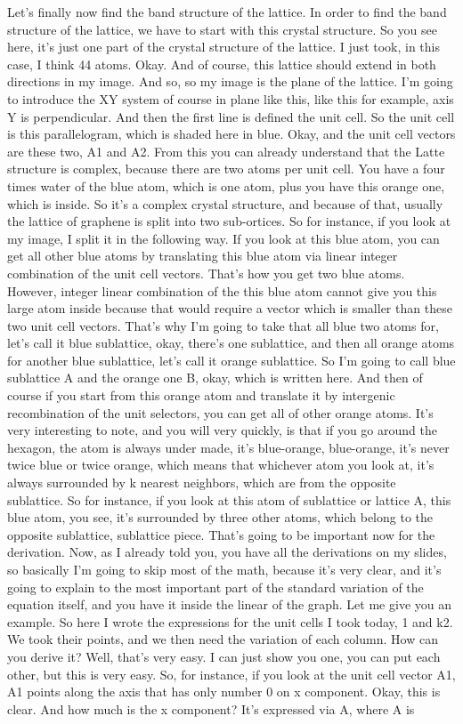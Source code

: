 Let's finally now find the band structure of the lattice. In order to find the band structure of the lattice, we have to start with this crystal structure. So you see here, it's just one part of the crystal structure of the lattice. I just took, in this case, I think 44 atoms. Okay. And of course, this lattice should extend in both directions in my image. And so, so my image is the plane of the lattice. I'm going to introduce the XY system of course in plane like this, like this for example, axis Y is perpendicular. And then the first line is defined the unit cell. So the unit cell is this parallelogram, which is shaded here in blue. Okay, and the unit cell vectors are these two, A1 and A2. From this you can already understand that the Latte structure is complex, because there are two atoms per unit cell. You have a four times water of the blue atom, which is one atom, plus you have this orange one, which is inside. So it's a complex crystal structure, and because of that, usually the lattice of graphene is split into two sub-ortices. So for instance, if you look at my image, I split it in the following way. If you look at this blue atom, you can get all other blue atoms by translating this blue atom via linear integer combination of the unit cell vectors. That's how you get two blue atoms. However, integer linear combination of the this blue atom cannot give you this large atom inside because that would require a vector which is smaller than these two unit cell vectors. That's why I'm going to take that all blue two atoms for, let's call it blue sublattice, okay, there's one sublattice, and then all orange atoms for another blue sublattice, let's call it orange sublattice. So I'm going to call blue sublattice A and the orange one B, okay, which is written here. And then of course if you start from this orange atom and translate it by intergenic recombination of the unit selectors, you can get all of other orange atoms. It's very interesting to note, and you will very quickly, is that if you go around the hexagon, the atom is always under made, it's blue-orange, blue-orange, it's never twice blue or twice orange, which means that whichever atom you look at, it's always surrounded by k nearest neighbors, which are from the opposite sublattice. So for instance, if you look at this atom of sublattice or lattice A, this blue atom, you see, it's surrounded by three other atoms, which belong to the opposite sublattice, sublattice piece. That's going to be important now for the derivation. Now, as I already told you, you have all the derivations on my slides, so basically I'm going to skip most of the math, because it's very clear, and it's going to explain to the most important part of the standard variation of the equation itself, and you have it inside the linear of the graph. Let me give you an example. So here I wrote the expressions for the unit cells I took today, 1 and k2. We took their points, and we then need the variation of each column. How can you derive it? Well, that's very easy. I can just show you one, you can put each other, but this is very easy. So, for instance, if you look at the unit cell vector A1, A1 points along the axis that has only number 0 on x component. Okay, this is clear. And how much is the x component? It's expressed via A, where A is 